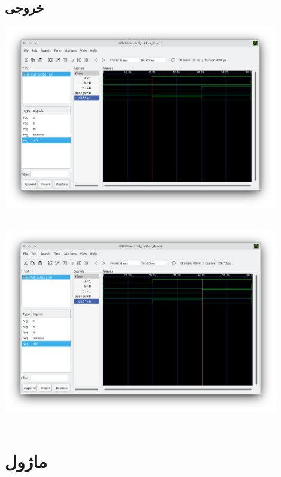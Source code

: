 \documentclass[dvipsnames, svgnames, x11names, a4paper, 11pt, oneside]{book}
\begin{document}
				\subsection{خروجی }
					\begin{center}
						\includegraphics[width=12cm, height=8cm]{./images/full_subber_vcd_1}
					\end{center}
					
					\begin{center}
						\includegraphics[width=12cm, height=9cm]{./images/full_subber_vcd_2}
					\end{center}
									
			\section{ماژول }
\end{document}
